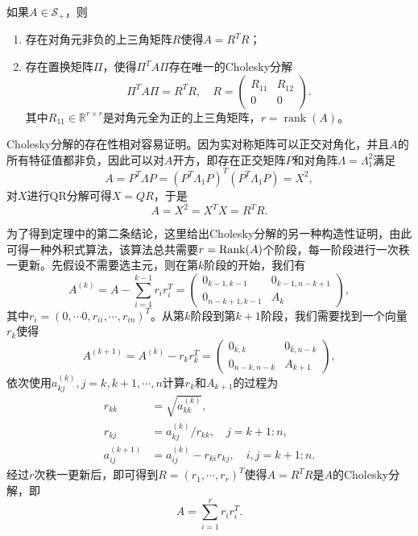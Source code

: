 \documentclass[a4paper,10pt]{ctexart}
\begin{document}
\begin{theorem}
    如果$ A\in \mathcal{S}_{+} $，则
    \begin{enumerate}
        \item 存在对角元非负的上三角矩阵$ R $使得$ A = R^TR $；
        \item 存在置换矩阵$ \Pi $，使得$ \Pi^T A \Pi $存在唯一的Cholesky分解
        \begin{equation}
            \Pi^T A \Pi = R^TR,\quad 
            R = 
            \begin{pmatrix}
                R_{11} & R_{12}\\
                0 & 0
            \end{pmatrix}.
        \end{equation}
        其中$ R_{11}\in \mathbb{R}^{r\times r} $是对角元全为正的上三角矩阵，$ r = \operatorname{rank}(A) $。
    \end{enumerate}
\end{theorem}
Cholesky分解的存在性相对容易证明。因为实对称矩阵可以正交对角化，并且$ A $的所有特征值都非负，因此可以对$ A $开方，即存在正交矩阵$ P $和对角阵$ \Lambda = \Lambda_1^2 $满足
\[
    A = P^T \Lambda P = (P^T \Lambda_1 P)^T(P^T \Lambda_1 P) = X^2,
\]
对$ X $进行QR分解可得$ X=QR $，于是
\[
    A = X^2 = X^T X = R^T R.
\]

为了得到定理中的第二条结论，这里给出Cholesky分解的另一种构造性证明，由此可得一种外积式算法，该算法总共需要$ r={\rm Rank}(A) $个阶段，每一阶段进行一次秩一更新。先假设不需要选主元，则在第$ k $阶段的开始，我们有
\begin{equation}
    A^{(k)} = A - \sum_{i=1}^{k-1} r_i r_i^T = 
    \begin{pmatrix}
        0_{k-1,k-1} & 0_{k-1,n-k+1}\\
        0_{n-k+1,k-1} & A_k
    \end{pmatrix},
\end{equation}
其中$ r_i = (0,\cdots 0, r_{ii}, \cdots , r_{in})^T $。从第$ k $阶段到第$ k+1 $阶段，我们需要找到一个向量$ r_{k} $使得
\[
    A^{(k+1)} = A^{(k)} - r_{k} r_{k}^T = 
    \begin{pmatrix}
        0_{k,k} & 0_{k,n-k}\\
        0_{n-k,n-k} & A_{k+1}
    \end{pmatrix},
\]
依次使用$ a^{(k)}_{kj},j=k,k+1,\cdots ,n $计算$ r_k $和$ A_{k+1} $的过程为
\begin{equation}\label{eq:OuterCholeskyDec}
    \begin{aligned}
        r_{kk} &= \sqrt{a_{kk}^{(k)}}, \\
        r_{kj} &= a_{kj}^{(k)}/r_{kk},\quad j = k+1:n,\\
        a_{ij}^{(k+1)} &= a_{ij}^{(k)} - r_{ki}r_{kj},\quad i,j = k+1:n.
    \end{aligned}
\end{equation}
经过$ r $次秩一更新后，即可得到$ R = (r_1,\cdots ,r_r)^T $使得$ A = R^TR $是$ A $的Cholesky分解，即
\begin{equation}
    A = \sum_{i=1}^r r_i r_i^T.
\end{equation}
\end{document}
